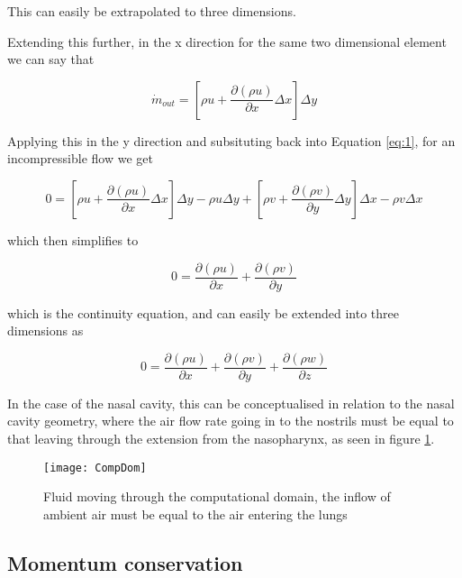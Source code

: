     This can easily be extrapolated to three dimensions.


Extending this further, in the x direction for the same two dimensional element we can say that

\begin{equation} \label{eq:22}
\dot{m}_{out} = [\rho u + \frac{\partial(\rho u)}{\partial x}\Delta x]\Delta y
\end{equation}

Applying this in the y direction and subsituting back into Equation \ref{eq:1}, for an incompressible flow we get
 
\begin{dmath} \label{eq:23}
0 = [\rho u + \frac{\partial(\rho u)}{\partial x}\Delta x]\Delta y - \rho u \Delta y 
+ [\rho v + \frac{\partial(\rho v)}{\partial y}\Delta y]\Delta x - \rho v \Delta x  
\end{dmath}

which then simplifies to

\begin{equation} \label{eq:24}
  0 = \frac{\partial(\rho u)}{\partial x} + \frac{\partial(\rho v)}{\partial y}
\end{equation}

which is the continuity equation, and can easily be extended into three dimensions as

\begin{equation} \label{eq:25}
  0 = \frac{\partial(\rho u)}{\partial x} + \frac{\partial(\rho v)}{\partial y} + \frac{\partial(\rho w)}{\partial z}
\end{equation}


    In the case of the nasal cavity, this can be conceptualised in relation to the nasal cavity geometry, where the air flow rate going in to the nostrils must be equal to that leaving through the extension from the nasopharynx, as seen in figure \ref{fig:CompDom}.

\begin{figure}   
  \centering
  \texttt{[image: CompDom]}
  \caption{Fluid moving through the computational domain, the inflow of ambient air must be equal to the air entering the lungs}
  \label{fig:CompDom}
\end{figure}

    \subsection{Momentum conservation}


